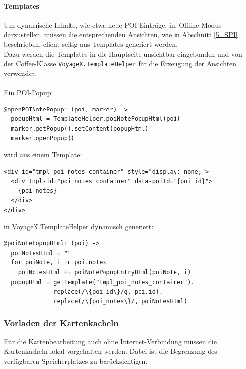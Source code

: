 \paragraph{Templates}
Um dynamische Inhalte, wie etwa neue POI-Einträge, im Offline-Modus darzustellen, müssen die entsprechenden Ansichten, wie in Abschnitt \ref{5_SPI} beschrieben, client-seitig aus Templates generiert werden.\\
Dazu werden die Templates in die Hauptseite unsichtbar eingebunden und von der Coffee-Klasse  \texttt{VoyageX.TemplateHelper} für die Erzeugung der Ansichten verwendet.\\ \\
Ein POI-Popup:
\lstset{language=Javascript}
\begin{lstlisting}[frame=single,numbers=none,xleftmargin=0pt]
@openPOINotePopup: (poi, marker) ->
  popupHtml = TemplateHelper.poiNotePopupHtml(poi)
  marker.getPopup().setContent(popupHtml)
  marker.openPopup()
\end{lstlisting}%
wird aus einem Template:
\lstset{language=Html}
\begin{lstlisting}[frame=single,numbers=none,xleftmargin=0pt]
<div id="tmpl_poi_notes_container" style="display: none;">
  <div tmpl-id="poi_notes_container" data-poiId="{poi_id}">
    {poi_notes}
  </div>
</div>
\end{lstlisting}%
in VoyageX.TemplateHelper dynamisch generiert:
\lstset{language=Javascript}
\begin{lstlisting}[frame=single,numbers=none,xleftmargin=0pt]
@poiNotePopupHtml: (poi) ->
  poiNotesHtml = ""
  for poiNote, i in poi.notes
    poiNotesHtml += poiNotePopupEntryHtml(poiNote, i)
  popupHtml = getTemplate("tmpl_poi_notes_container").
              replace(/\{poi_id\}/g, poi.id).
              replace(/\{poi_notes\}/, poiNotesHtml)
\end{lstlisting}%


\subsubsection{Vorladen der Kartenkacheln}
Für die Kartenbearbeitung auch ohne Internet-Verbindung müssen die Kartenkacheln 
lokal vorgehalten werden. Dabei ist die Begrenzung des verfügbaren Speicherplatzes zu berücksichtigen.

